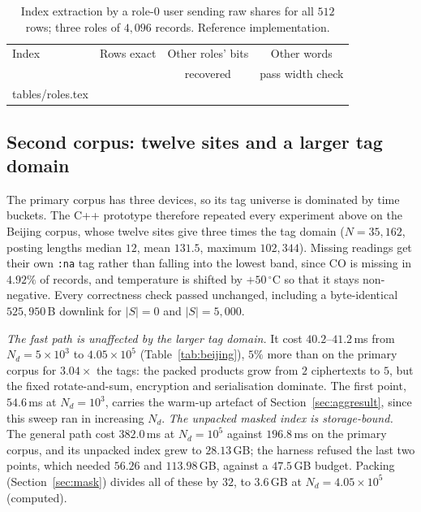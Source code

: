 \documentclass[a4paper,fleqn]{cas-sc}
\begin{document}
\begin{table}[pos=htbp]
\caption{Index extraction by a role-$0$ user sending raw shares for all
$512$ rows; three roles of $4{,}096$ records. Reference implementation.}
\label{tab:roles}
\centering
\footnotesize
\begin{tabular*}{\tblwidth}{@{\extracolsep{\fill}}lccc@{}}
\toprule
Index & Rows exact & Other roles' bits & Other words \\
 & & recovered & pass width check \\
\midrule
{} tables/roles.tex 
\bottomrule
\end{tabular*}
\end{table}

\subsection{Second corpus: twelve sites and a larger tag domain}
\label{sec:secondcorpus}
The primary corpus has three devices, so its tag universe is dominated by time
buckets. The C++ prototype therefore repeated every experiment above on the
Beijing corpus, whose twelve sites give three times the tag domain
($N=35{,}162$, posting lengths median $12$, mean $131.5$, maximum $102{,}344$).
Missing readings get their own \texttt{:na} tag rather than falling into the
lowest band, since CO is missing in $4.92\%$ of records, and temperature is
shifted by $+50\,^\circ$C so that it stays non-negative. Every correctness
check passed unchanged, including a byte-identical $525{,}950$\,B downlink for
$|S|=0$ and $|S|=5{,}000$.

\emph{The fast path is unaffected by the larger tag domain.} It cost
$40.2$--$41.2$\,ms from $N_d=5\times10^3$ to $4.05\times10^5$
(Table~\ref{tab:beijing}), $5\%$ more than on the primary corpus for
$3.04\times$ the tags: the packed products grow from $2$ ciphertexts to $5$,
but the fixed rotate-and-sum, encryption and serialisation dominate. The first
point, $54.6$\,ms at $N_d=10^3$, carries the warm-up artefact of
Section~\ref{sec:aggresult}, since this sweep ran in increasing $N_d$.
\emph{The unpacked masked index is storage-bound.} The general path cost
$382.0$\,ms at $N_d=10^5$ against $196.8$\,ms on the primary corpus, and its
unpacked index grew to $28.13$\,GB; the harness refused the last two points,
which needed $56.26$ and $113.98$\,GB, against a $47.5$\,GB budget. Packing
(Section~\ref{sec:mask}) divides all of these by $32$, to $3.6$\,GB at
$N_d=4.05\times10^5$ (computed).
\end{document}
